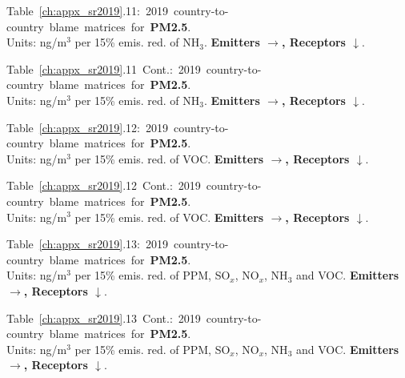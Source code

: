 \footnotesize{\mbox{Table \ref{ch:appx_sr2019}.11: 2019 country-to-country blame matrices for \textbf{PM2.5}.}\\ Units: ng/m$^3$ per 15\% emis. red. of NH$_3$. \textbf{Emitters $\rightarrow$, Receptors $\downarrow$}. }\\[\baselineskip]\enlargethispage{\myenlarge} \hspace{-0.5cm} 
\centerline{}\clearpage
\footnotesize{\mbox{Table \ref{ch:appx_sr2019}.11 Cont.: 2019 country-to-country blame matrices for \textbf{PM2.5}.}\\ Units: ng/m$^3$ per 15\% emis. red. of NH$_3$. \textbf{Emitters $\rightarrow$, Receptors $\downarrow$}. }\\[\baselineskip]\enlargethispage{\myenlarge} \hspace{-0.5cm} 
\centerline{}\clearpage

\footnotesize{\mbox{Table \ref{ch:appx_sr2019}.12: 2019 country-to-country blame matrices for \textbf{PM2.5}.}\\ Units: ng/m$^3$ per 15\% emis. red. of VOC. \textbf{Emitters $\rightarrow$, Receptors $\downarrow$}. }\\[\baselineskip]\enlargethispage{\myenlarge} \hspace{-0.5cm} 
\centerline{}\clearpage
\footnotesize{\mbox{Table \ref{ch:appx_sr2019}.12 Cont.: 2019 country-to-country blame matrices for \textbf{PM2.5}.}\\ Units: ng/m$^3$ per 15\% emis. red. of VOC. \textbf{Emitters $\rightarrow$, Receptors $\downarrow$}. }\\[\baselineskip]\enlargethispage{\myenlarge} \hspace{-0.5cm} 
\centerline{}\clearpage



\footnotesize{\mbox{Table \ref{ch:appx_sr2019}.13: 2019 country-to-country blame matrices for \textbf{PM2.5}.}\\ Units: ng/m$^3$ per 15\% emis. red. of PPM, SO$_x$, NO$_x$, NH$_3$ and VOC. \textbf{Emitters $\rightarrow$, Receptors $\downarrow$}. }\\[\baselineskip]\enlargethispage{\myenlarge} \hspace{-0.5cm} 
\centerline{}\clearpage
\footnotesize{\mbox{Table \ref{ch:appx_sr2019}.13 Cont.: 2019 country-to-country blame matrices for \textbf{PM2.5}.}\\ Units: ng/m$^3$ per 15\% emis. red. of PPM, SO$_x$, NO$_x$, NH$_3$ and VOC. \textbf{Emitters $\rightarrow$, Receptors $\downarrow$}. }\\[\baselineskip]\enlargethispage{\myenlarge} \hspace{-0.5cm} 
\centerline{}\clearpage



